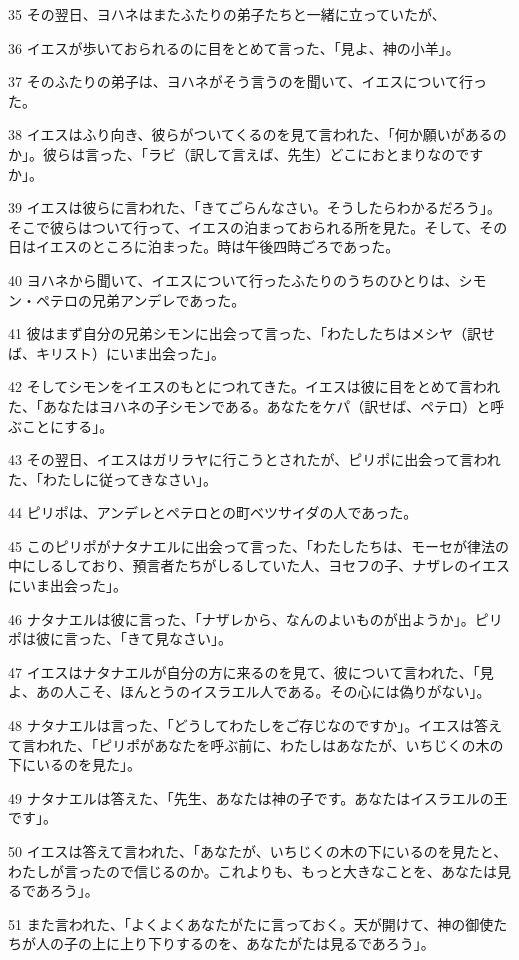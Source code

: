 \par 35 その翌日、ヨハネはまたふたりの弟子たちと一緒に立っていたが、
\par 36 イエスが歩いておられるのに目をとめて言った、「見よ、神の小羊」。
\par 37 そのふたりの弟子は、ヨハネがそう言うのを聞いて、イエスについて行った。
\par 38 イエスはふり向き、彼らがついてくるのを見て言われた、「何か願いがあるのか」。彼らは言った、「ラビ（訳して言えば、先生）どこにおとまりなのですか」。
\par 39 イエスは彼らに言われた、「きてごらんなさい。そうしたらわかるだろう」。そこで彼らはついて行って、イエスの泊まっておられる所を見た。そして、その日はイエスのところに泊まった。時は午後四時ごろであった。
\par 40 ヨハネから聞いて、イエスについて行ったふたりのうちのひとりは、シモン・ペテロの兄弟アンデレであった。
\par 41 彼はまず自分の兄弟シモンに出会って言った、「わたしたちはメシヤ（訳せば、キリスト）にいま出会った」。
\par 42 そしてシモンをイエスのもとにつれてきた。イエスは彼に目をとめて言われた、「あなたはヨハネの子シモンである。あなたをケパ（訳せば、ペテロ）と呼ぶことにする」。
\par 43 その翌日、イエスはガリラヤに行こうとされたが、ピリポに出会って言われた、「わたしに従ってきなさい」。
\par 44 ピリポは、アンデレとペテロとの町ベツサイダの人であった。
\par 45 このピリポがナタナエルに出会って言った、「わたしたちは、モーセが律法の中にしるしており、預言者たちがしるしていた人、ヨセフの子、ナザレのイエスにいま出会った」。
\par 46 ナタナエルは彼に言った、「ナザレから、なんのよいものが出ようか」。ピリポは彼に言った、「きて見なさい」。
\par 47 イエスはナタナエルが自分の方に来るのを見て、彼について言われた、「見よ、あの人こそ、ほんとうのイスラエル人である。その心には偽りがない」。
\par 48 ナタナエルは言った、「どうしてわたしをご存じなのですか」。イエスは答えて言われた、「ピリポがあなたを呼ぶ前に、わたしはあなたが、いちじくの木の下にいるのを見た」。
\par 49 ナタナエルは答えた、「先生、あなたは神の子です。あなたはイスラエルの王です」。
\par 50 イエスは答えて言われた、「あなたが、いちじくの木の下にいるのを見たと、わたしが言ったので信じるのか。これよりも、もっと大きなことを、あなたは見るであろう」。
\par 51 また言われた、「よくよくあなたがたに言っておく。天が開けて、神の御使たちが人の子の上に上り下りするのを、あなたがたは見るであろう」。

